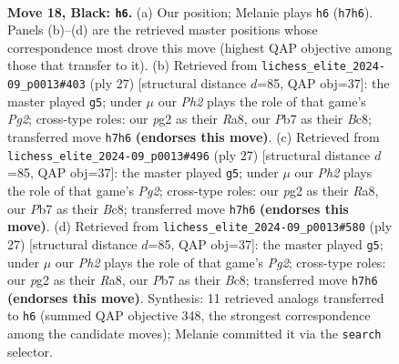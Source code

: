 \documentclass[11pt]{article}
\begin{document}
\begin{figure}[p]
\label{fig:thought-m33}
\end{figure}

\clearpage

\begin{figure}[p]\centering
\begin{subfigure}{0.46\textwidth}\centering
\resizebox{\linewidth}{!}{%
\newchessgame
\chessboard[
  setfen={r1b3k1/ppppqppp/1b1n4/3P4/8/2N4P/PPPBBPP1/R3Q1K1 b - - 8 18},
  showmover=false,
  pgfstyle=straightmove, color=movearrow, markmove={h7-h6}
]}
\caption{}
\end{subfigure}\hfill
\begin{subfigure}{0.46\textwidth}\centering
\resizebox{\linewidth}{!}{%
\newchessgame
\chessboard[
  setfen={r1bq2k1/ppp2ppp/3p1b2/5n2/3P1B2/2P5/PP1N1PPP/R3QBK1 b - - 1 14},
  showmover=false,
  pgfstyle=straightmove, color=movearrow, markmove={g7-g5}
]}
\caption{}
\end{subfigure}
\\[4pt]
\begin{subfigure}{0.46\textwidth}\centering
\resizebox{\linewidth}{!}{%
\newchessgame
\chessboard[
  setfen={r1bq2k1/ppp2ppp/3p1b2/5n2/3P1B2/2P5/PP1N1PPP/R3QBK1 b - - 1 14},
  showmover=false,
  pgfstyle=straightmove, color=movearrow, markmove={g7-g5}
]}
\caption{}
\end{subfigure}\hfill
\begin{subfigure}{0.46\textwidth}\centering
\resizebox{\linewidth}{!}{%
\newchessgame
\chessboard[
  setfen={r1bq2k1/ppp2ppp/3p1b2/5n2/3P1B2/2P5/PP1N1PPP/R3QBK1 b - - 1 14},
  showmover=false,
  pgfstyle=straightmove, color=movearrow, markmove={g7-g5}
]}
\caption{}
\end{subfigure}
\caption{\textbf{Move 18, Black: \texttt{h6}.} (a) Our position; Melanie plays \texttt{h6} (\texttt{h7h6}). Panels (b)--(d) are the retrieved master positions whose correspondence most drove this move (highest QAP objective among those that transfer to it). (b) Retrieved from \texttt{lichess\_elite\_2024-09\_p0013\#403} (ply 27) [structural distance $d$=85, QAP obj=37]: the master played \texttt{g5}; under $\mu$ our \emph{Ph2} plays the role of that game's \emph{Pg2}; cross-type roles: our \emph{p}g2 as their \emph{R}a8, our \emph{P}b7 as their \emph{B}c8; transferred move \texttt{h7h6} \textbf{(endorses this move)}. (c) Retrieved from \texttt{lichess\_elite\_2024-09\_p0013\#496} (ply 27) [structural distance $d$=85, QAP obj=37]: the master played \texttt{g5}; under $\mu$ our \emph{Ph2} plays the role of that game's \emph{Pg2}; cross-type roles: our \emph{p}g2 as their \emph{R}a8, our \emph{P}b7 as their \emph{B}c8; transferred move \texttt{h7h6} \textbf{(endorses this move)}. (d) Retrieved from \texttt{lichess\_elite\_2024-09\_p0013\#580} (ply 27) [structural distance $d$=85, QAP obj=37]: the master played \texttt{g5}; under $\mu$ our \emph{Ph2} plays the role of that game's \emph{Pg2}; cross-type roles: our \emph{p}g2 as their \emph{R}a8, our \emph{P}b7 as their \emph{B}c8; transferred move \texttt{h7h6} \textbf{(endorses this move)}. Synthesis: 11 retrieved analogs transferred to \texttt{h6} (summed QAP objective 348, the strongest correspondence among the candidate moves); Melanie committed it via the \texttt{search} selector.}

\end{figure}
\end{document}

